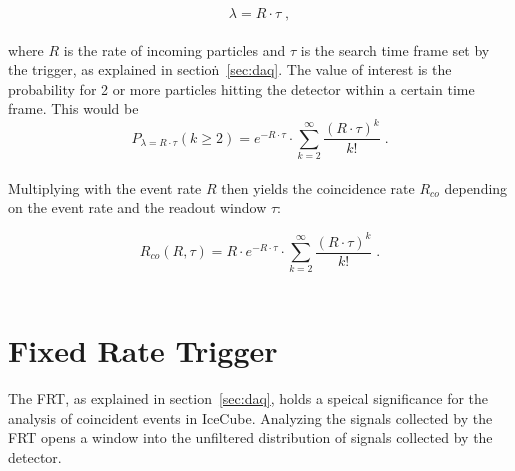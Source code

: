 \begin{equation}
    \lambda = R \cdot \tau \; ,
\end{equation}\\

where $R$ is the rate of incoming particles and $\tau$ is the search time frame set by the trigger, as explained in section\.~\ref{sec:daq}. 
The value of interest is the probability for 2 or more particles hitting the detector within a certain time frame. This would be \\

\begin{equation}
    P_{\lambda = R\cdot\tau}(k\geq2) = e^{- R\cdot\tau} \cdot \sum_{k=2}^\infty \frac{{(R\cdot\tau)}^k}{k!} \; .
\end{equation}\\ 

Multiplying with the event rate $R$ then yields the coincidence rate $R_{co}$ depending on the event rate and the readout window $\tau$:

\begin{equation}
    R_{co}(R,\tau) = R \cdot e^{- R\cdot\tau} \cdot \sum_{k=2}^\infty \frac{{(R\cdot\tau)}^k}{k!}\;.
\end{equation}\\

\section{Fixed Rate Trigger}

The FRT, as explained in section\@~\ref{sec:daq}, holds a speical significance for the analysis of coincident events in IceCube. 
Analyzing the signals collected by the FRT opens a window into the unfiltered distribution of signals collected by the detector. 



